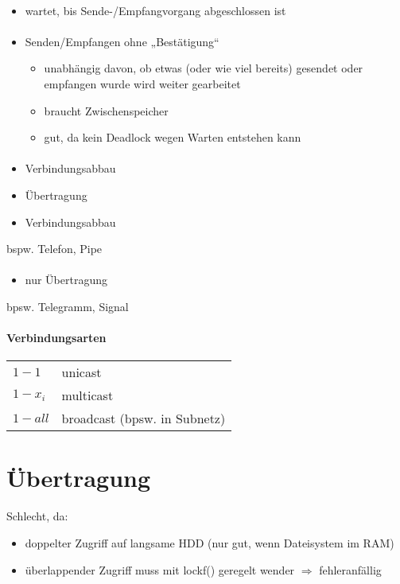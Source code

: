 \paragraph{}
\begin{itemize}
\item wartet, bis Sende-/Empfangvorgang abgeschlossen ist
\end{itemize}
\paragraph{}
\begin{itemize}
\item Senden/Empfangen ohne „Bestätigung“
\begin{itemize}[label=$\to$]
\item unabhängig davon, ob etwas (oder wie viel bereits) gesendet oder empfangen wurde wird weiter gearbeitet
\item braucht Zwischenspeicher
\item gut, da kein Deadlock wegen Warten entstehen kann
\end{itemize}
\end{itemize}
\paragraph{}
\begin{itemize}
\item Verbindungsabbau
\item Übertragung
\item Verbindungsabbau
\end{itemize}
bspw. Telefon, Pipe
\paragraph{}
\begin{itemize}
\item nur Übertragung
\end{itemize}
bpsw. Telegramm, Signal
\paragraph{Verbindungsarten}
\begin{tabular}{l l}
$1-1$ & unicast\\
$1-x_i$ & multicast\\
$1-all$ & broadcast (bpsw. in Subnetz)
\end{tabular}
\section[Übertragung über Datei]{Übertragung }
Schlecht, da:
\begin{itemize}
\item doppelter Zugriff auf langsame HDD (nur gut, wenn Dateisystem im RAM)
\item überlappender Zugriff muss mit lockf() geregelt wender $\Rightarrow$ fehleranfällig
\end{itemize}

